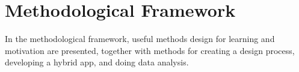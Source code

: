 \section{Methodological Framework}

  In the methodological framework, useful methods design for learning and motivation are presented, together with methods for creating a design process, developing a hybrid app, and doing data analysis.

  

  

  

  

  

  

  
